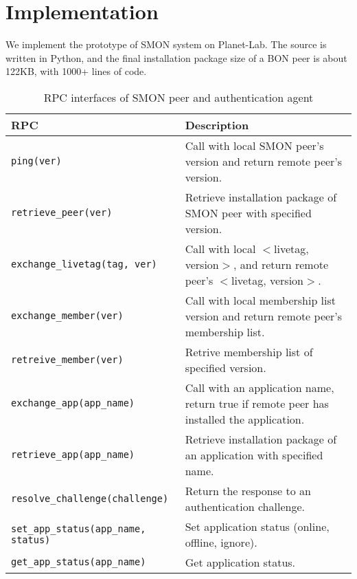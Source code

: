 \section{Implementation}
\label{sec:impl}

We implement the prototype of SMON system on Planet-Lab.  The
source is written in Python, and the final installation
package size of a BON peer is about 122KB, with 1000+ lines
of code.

\begin{table*}
\small
\centering
\begin{tabular}{|l|l|}

\hline
\textbf{RPC} & \textbf{Description} \\

\hline
\texttt{ping(ver)} & Call with local SMON peer's version and
return remote peer's version.\\

\hline
\texttt{retrieve\_peer(ver)} & Retrieve installation package
of SMON peer with specified version.\\

\hline
\texttt{exchange\_livetag(tag, ver)} & Call with local
$<$livetag, version$>$, and return remote peer's $<$livetag,
version$>$.\\

\hline
\texttt{exchange\_member(ver)} & Call with local membership
list version and return remote peer's membership list.\\

\hline
\texttt{retreive\_member(ver)} & Retrive membership list of
specified version.\\

\hline
\texttt{exchange\_app(app\_name)} & Call with an application
name, return true if remote peer has installed the
application.\\

\hline
\texttt{retrieve\_app(app\_name)} & Retrieve installation package
of an application with specified name.\\

\hline
\texttt{resolve\_challenge(challenge)} & Return the response
to an authentication challenge.\\

\hline
\texttt{set\_app\_status(app\_name, status)} & Set application status (online,
offline, ignore).\\

\hline
\texttt{get\_app\_status(app\_name)} & Get application status. \\

\hline

\end{tabular}
\caption{RPC interfaces of SMON peer and authentication
agent}
\label{fig:rpc}
\end{table*}

